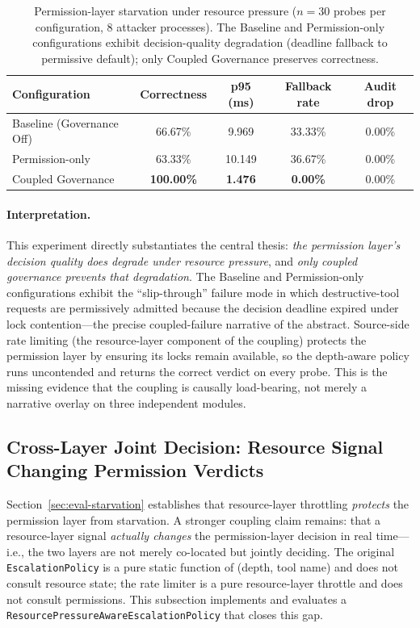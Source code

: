 \begin{table}[t]
\centering
\caption{Permission-layer starvation under resource pressure ($n=30$
probes per configuration, 8 attacker processes). The Baseline and
Permission-only configurations exhibit decision-quality degradation
(deadline fallback to permissive default); only Coupled Governance
preserves correctness.}
\label{tab:starvation}
\begin{tabular}{lcccc}
\toprule
Configuration & Correctness & p95 (ms) & Fallback rate & Audit drop \\
\midrule
Baseline (Governance Off) & 66.67\% & 9.969 & 33.33\% & 0.00\% \\
Permission-only           & 63.33\% & 10.149 & 36.67\% & 0.00\% \\
Coupled Governance        & \textbf{100.00\%} & \textbf{1.476} & \textbf{0.00\%} & 0.00\% \\
\bottomrule
\end{tabular}
\end{table}

\paragraph{Interpretation.}
This experiment directly substantiates the central thesis: \emph{the
permission layer's decision quality does degrade under resource
pressure}, and \emph{only coupled governance prevents that
degradation}. The Baseline and Permission-only configurations exhibit
the ``slip-through'' failure mode in which destructive-tool requests
are permissively admitted because the decision deadline expired under
lock contention---the precise coupled-failure narrative of the
abstract. Source-side rate limiting (the resource-layer component of
the coupling) protects the permission layer by ensuring its locks
remain available, so the depth-aware policy runs uncontended and
returns the correct verdict on every probe. This is the missing
evidence that the coupling is causally load-bearing, not merely a
narrative overlay on three independent modules.

\subsection{Cross-Layer Joint Decision: Resource Signal Changing
Permission Verdicts}
\label{sec:eval-joint}

Section~\ref{sec:eval-starvation} establishes that resource-layer
throttling \emph{protects} the permission layer from starvation. A
stronger coupling claim remains: that a resource-layer signal
\emph{actually changes} the permission-layer decision in real
time---i.e., the two layers are not merely co-located but jointly
deciding. The original \texttt{EscalationPolicy} is a pure static
function of (depth, tool name) and does not consult resource state;
the rate limiter is a pure resource-layer throttle and does not
consult permissions. This subsection implements and evaluates a
\texttt{ResourcePressureAwareEscalationPolicy} that closes this gap.

